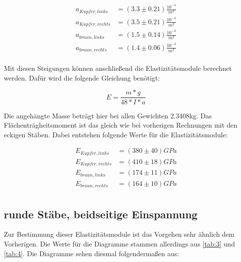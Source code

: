\begin{align*}
    a_{Kupfer, links} &= (3.3\pm 0.21) \frac{10^{-3}}{m^2}\\
    a_{Kupfer, rechts} &= (3.5\pm 0.21) \frac{10^{-3}}{m^2}\\
    a_{braun, links} &= (1.5\pm 0.14) \frac{10^{-3}}{m^2}\\
    a_{braun, rechts} &= (1.4\pm 0.06) \frac{10^{-3}}{m^2}\\
\end{align*}

\noindent Mit diesen Steigungen können anschließend die Elastizitätsmodule berechnet werden. Dafür wird die folgende Gleichung benötigt:

\begin{displaymath}
    E = \frac{m*g}{48*I*a}
\end{displaymath}

\noindent Die angehängte Masse beträgt hier bei allen Gewichten 2.3408kg. Das Flächenträgheitsmoment ist das gleich wie bei vorherigen Rechnungen mit den eckigen Stäben. Dabei entstehen folgende Werte für die Elastizitätsmodule:

\begin{align*}
    E_{Kupfer, links} &= (380\pm 40)GPa\\
    E_{Kupfer, rechts} &= (410\pm 18)GPa\\
    E_{braun, links} &= (174\pm 11)GPa\\
    E_{braun, rechts} &= (164\pm 10)GPa\\
\end{align*}

\subsection{runde Stäbe, beidseitige Einspannung}

Zur Bestimmung dieser Elastizitätsmodule ist das Vorgehen sehr ähnlich dem Vorherigen. Die Werte für die Diagramme stammen allerdings aus \ref{tab:3} und \ref{tab:4}. Die Diagramme sehen diesmal folgendermaßen aus:

